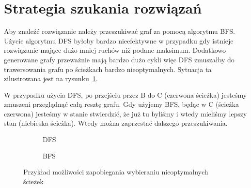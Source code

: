 \section{Strategia szukania rozwiązań}

Aby znaleźć rozwiązanie należy przeszukiwać graf za pomocą algorytmu BFS.
Użycie algorytmu DFS byłoby bardzo nieefektywne w przypadku gdy istnieje
rozwiązanie mające dużo mniej ruchów niż podane maksimum.
Dodatkowo generowane grafy przeważnie mają bardzo dużo cykli więc
DFS zmuszałby do trawersowania grafu po ścieżkach bardzo nieoptymalnych.
Sytuacja ta zilustrowana jest na rysunku~\ref{fig:dfs-vs-bfs}.

W przypadku użycia DFS, po przejściu przez B do C (czerwona ścieżka) jesteśmy
zmuszeni przeglądnąć całą resztę grafu.
Gdy użyjemy BFS, będąc w C (ścieżka czerwona) jesteśmy w stanie stwierdzić,
że już tu byliśmy i wtedy mieliśmy lepszy stan\footnotemark{} (niebieska ścieżka).
Wtedy można zaprzestać dalszego przeszukiwania.


\vspace{1cm}

\begin{figure}[!h]
    \centering
    \begin{subfigure}[b]{0.4\textwidth}
        \centering
        
        \caption{DFS}
    \end{subfigure}
    \begin{subfigure}[b]{0.4\textwidth}
        \centering
        
        \caption{BFS}
    \end{subfigure}
    \caption{Przykład możliwości zapobiegania wybieraniu nieoptymalnych ścieżek}
    \label{fig:dfs-vs-bfs}
\end{figure}




